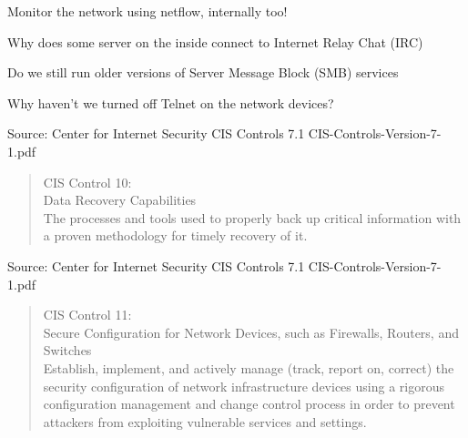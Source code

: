\documentclass[Screen16to9,17pt]{foils}
\begin{document}
\begin{list1}
\item Monitor the network using netflow, internally too!
\item Why does some server on the inside connect to Internet Relay Chat (IRC)
\item Do we still run older versions of Server Message Block (SMB) services
\item Why haven't we turned off Telnet on the network devices?
\end{list1}

Source: Center for Internet Security CIS Controls 7.1 CIS-Controls-Version-7-1.pdf


\begin{quote}
CIS Control 10:\\
Data Recovery Capabilities\\
The processes and tools used to properly back up critical information with a proven methodology for timely recovery of it.
\end{quote}

\begin{list1}
\item
\item
\item
\item
\end{list1}

Source: Center for Internet Security CIS Controls 7.1 CIS-Controls-Version-7-1.pdf


\begin{quote}
CIS Control 11:\\
Secure Configuration for Network Devices, such as Firewalls, Routers, and Switches\\
Establish, implement, and actively manage (track, report on, correct) the security configuration of network infrastructure devices using a rigorous configuration management and change control process in order to prevent attackers from exploiting vulnerable services and settings.
\end{quote}

\begin{list1}
\item
\item
\item
\item
\end{list1}
\end{document}
